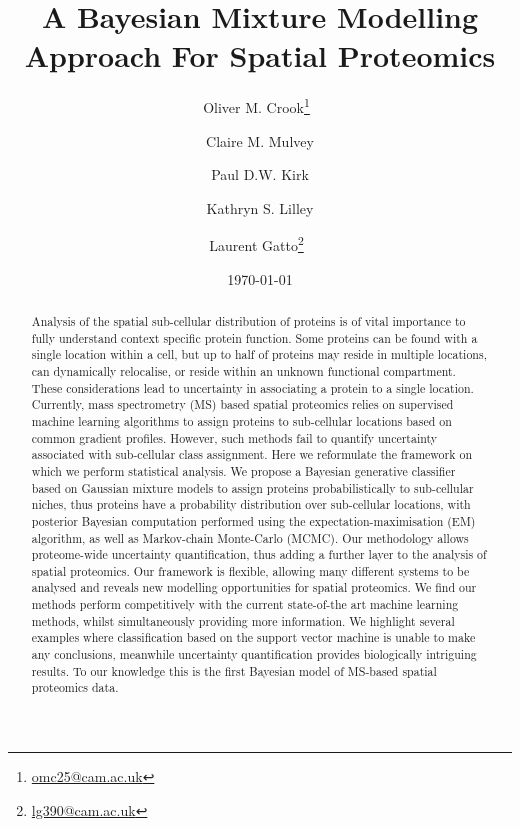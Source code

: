 \documentclass[12pt,english]{article}
\begin{document}


\author[1,2,3]{Oliver M. Crook\thanks{\url{omc25@cam.ac.uk}}~}
\author[2]{Claire M. Mulvey}
\author[3]{Paul D.W. Kirk}
\author[2]{Kathryn S. Lilley}
\author[1,2]{Laurent Gatto\thanks{\url{lg390@cam.ac.uk}}~}





\title{A Bayesian Mixture Modelling Approach For Spatial Proteomics}

\date{\small \today}

\maketitle
\linenumbers
\begin{abstract}
  Analysis of the spatial sub-cellular distribution of proteins is of
  vital importance to fully understand context specific protein
  function. Some proteins can be found with a single location within a
  cell, but up to half of proteins may reside in multiple locations,
  can dynamically relocalise, or reside within an unknown functional
  compartment. These considerations lead to uncertainty in associating
  a protein to a single location. Currently, mass spectrometry (MS)
  based spatial proteomics relies on supervised machine learning
  algorithms to assign proteins to sub-cellular locations based on
  common gradient profiles. However, such methods fail to quantify
  uncertainty associated with sub-cellular class assignment. Here we
  reformulate the framework on which we perform statistical
  analysis. We propose a Bayesian generative classifier based on
  Gaussian mixture models to assign proteins probabilistically to
  sub-cellular niches, thus proteins have a probability distribution
  over sub-cellular locations, with posterior Bayesian computation
  performed using the expectation-maximisation (EM) algorithm, as well
  as Markov-chain Monte-Carlo (MCMC). Our methodology allows
  proteome-wide uncertainty quantification, thus adding a further
  layer to the analysis of spatial proteomics. Our framework is
  flexible, allowing many different systems to be analysed and reveals
  new modelling opportunities for spatial proteomics. We find our
  methods perform competitively with the current state-of-the art
  machine learning methods, whilst simultaneously providing more
  information. We highlight several examples where classification
  based on the support vector machine is unable to make any
  conclusions, meanwhile uncertainty quantification provides
  biologically intriguing results.  To our knowledge this is the first
  Bayesian model of MS-based spatial proteomics data.
\end{abstract}
\end{document}
